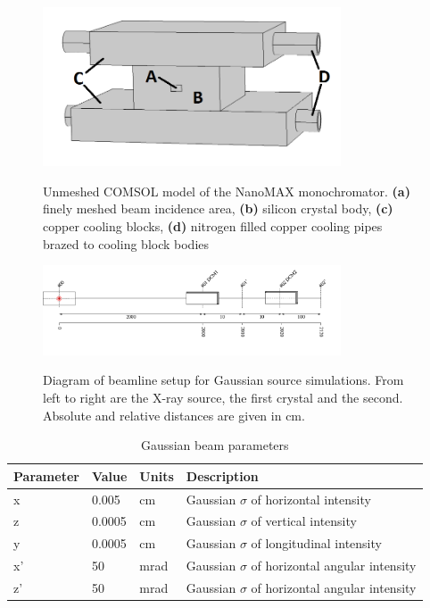 \documentclass[preprint]{iucr}              %
\begin{document}
\begin{figure}
\caption{Unmeshed COMSOL model of the NanoMAX monochromator. \textbf{(a)} finely meshed beam incidence area, \textbf{(b)} silicon crystal body, \textbf{(c)} copper cooling blocks, \textbf{(d)} nitrogen filled copper cooling pipes brazed to cooling block bodies}
\includegraphics[width = 8.85cm]{images/nanomaxcomsol.png}
\label{fig:nanomaxcomsol}
\end{figure}


\begin{figure}
\caption{Diagram of beamline setup for Gaussian source simulations. From left to right are the X-ray source, the first crystal and the second. Absolute and relative distances are given in cm.}
\includegraphics[width = 8.85cm]{images/gaussian_beamline.png}
\label{fig:dcmtracing}
\end{figure}



\begin{table}\label{gaussian_table}
\caption{Gaussian beam parameters}
\begin{tabular}{@{}llll@{}}
Parameter       & Value         & Units     & Description                                          \\
\hline
x               & 0.005         & cm        & Gaussian $\sigma$ of horizontal intensity            \\
z               & 0.0005        & cm        & Gaussian $\sigma$ of vertical intensity              \\ 
y               & 0.0005        & cm        & Gaussian $\sigma$ of longitudinal intensity          \\
x'              & 50            & mrad      & Gaussian $\sigma$ of horizontal angular intensity    \\
z'              & 50            & mrad      & Gaussian $\sigma$ of horizontal angular intensity    \\

\end{tabular}
\end{table}
\end{document}
